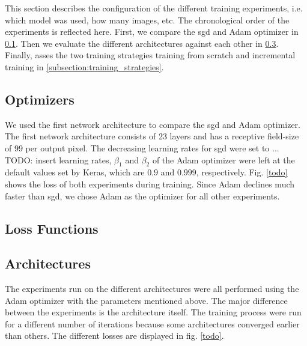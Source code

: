 
This section describes the configuration of the different training experiments, i.e. which model was used, how many images, etc. The chronological order of the experiments is reflected here. First, we compare the \gls{sgd} and Adam optimizer in \ref{subsection:optimizers}. Then we evaluate the different architectures against each other in \ref{subsection:architectures}. Finally, asses the two training strategies training from scratch and incremental training in \ref{subsection:training_strategies}.

\subsection{Optimizers} \label{subsection:optimizers}

We used the first network architecture to compare the \gls{sgd} and Adam optimizer. The first network architecture consists of 23 layers and has a receptive field-size of 99 per output pixel. The decreasing learning rates for \gls{sgd} were set to ... TODO: insert learning rates, $\beta_1$ and $\beta_2$ of the Adam optimizer were left at the default values set by Keras, which are $0.9$ and $0.999$, respectively. Fig. \ref{todo} shows the loss of both experiments during training. Since Adam declines much faster than \gls{sgd}, we chose Adam as the optimizer for all other experiments.

\subsection{Loss Functions}


\subsection{Architectures} \label{subsection:architectures}


The experiments run on the different architectures were all performed using the Adam optimizer with the parameters mentioned above. The major difference between the experiments is the architecture itself. The training process were run for a different number of iterations because some architectures converged earlier than others. The different losses are displayed in fig. \ref{todo}.

